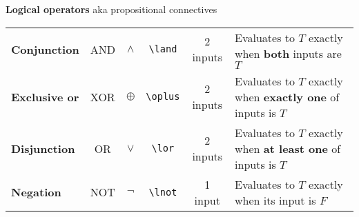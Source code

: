 
{\bf Logical operators} aka propositional connectives

\begin{tabular}{lccccp{4in}}
{\bf Conjunction} & AND & $\land$ &\verb|\land| & 2 inputs & Evaluates to $T$ exactly when {\bf both} inputs are $T$\\
{\bf Exclusive or} & XOR & $\oplus$ &\verb|\oplus| & 2 inputs & Evaluates to $T$ exactly when {\bf exactly one} of inputs is $T$\\
{\bf Disjunction} & OR & $\lor$ &\verb|\lor| & 2 inputs & Evaluates to $T$ exactly when {\bf at least one} of inputs is $T$\\
{\bf Negation} & NOT & $\lnot$ &\verb|\lnot| & 1 input & Evaluates to $T$ exactly when its input is $F$\\
\end{tabular}